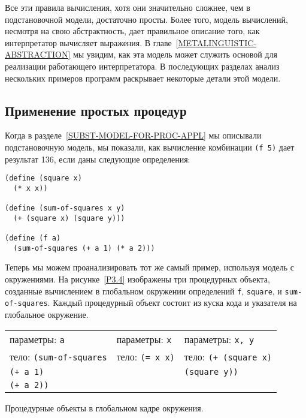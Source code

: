 Все эти правила вычисления, хотя они значительно сложнее,
чем в подстановочной модели, достаточно просты.  Более того, модель
вычислений, несмотря на свою абстрактность, дает правильное описание
того, как интерпретатор вычисляет выражения.  В
главе~\ref{METALINGUISTIC-ABSTRACTION} мы увидим, как эта модель
может служить основой для реализации работающего интерпретатора.
В последующих разделах анализ нескольких примеров программ
раскрывает некоторые детали этой модели.

\subsection{Применение простых процедур}
\label{APPLYING-SIMPLE-PROCEDURES}


Когда в разделе~\ref{SUBST-MODEL-FOR-PROC-APPL}
мы описывали подстановочную модель, мы показали, как вычисление
комбинации {\tt (f 5)} дает результат 136, если даны следующие
определения:

\begin{Verbatim}[fontsize=\small]
(define (square x)
  (* x x))

(define (sum-of-squares x y)
  (+ (square x) (square y)))

(define (f a)
  (sum-of-squares (+ a 1) (* a 2)))
\end{Verbatim}
Теперь мы можем проанализировать тот же самый пример, используя
модель с окружениями.  На рисунке~\ref{P3.4}
изображены три процедурных объекта, созданные
вычислением в глобальном окружении определений {\tt f},
{\tt square}, и {\tt sum-of-squares}.  Каждый
процедурный объект состоит из куска кода и указателя на глобальное
окружение.


\begin{cntrfig}

\begin{tabular}{lll}
параметры: {\tt a}   & параметры: {\tt x} & параметры: {\tt x, y} \\
тело: \texttt{(sum-of-squares} & тело:  \texttt{(= x x)} & тело: \texttt{(+ (square x)} \\
\hspace{1cm} \tt{(+ a 1)} & & \hspace{1,55cm}\texttt{(square y))} \\
\hspace{1cm} \texttt{(+ a 2))}
\end{tabular}
\caption{Процедурные объекты в глобальном
кадре окружения.}
\label{P3.4}

\end{cntrfig}


